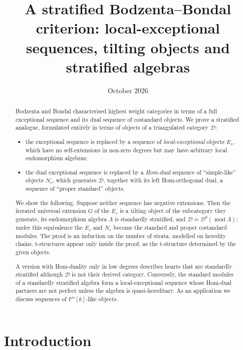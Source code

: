 \documentclass[11pt,reqno]{amsart}
\title[Local-exceptional sequences and stratified algebras]{A stratified Bodzenta--Bondal criterion: local-exceptional sequences, tilting objects and stratified algebras}
\date{October 2026}
\theoremstyle{plain}
\theoremstyle{definition}
\theoremstyle{remark}
\newcommand{\modd}{\operatorname{mod}}
\newcommand{\Db}{\mathcal{D}^b}
\newcommand{\Pn}[2]{\mathbb{P}^{#1}[#2]}
\newcommand{\cD}{\mathcal{D}}
\begin{document}
\begin{abstract}
Bodzenta and Bondal characterised highest weight categories in terms of a full exceptional sequence and its dual sequence of costandard objects. We prove a stratified analogue, formulated entirely in terms of objects of a triangulated category $\cD$:
\begin{itemize}
\item the exceptional sequence is replaced by a sequence of \emph{local-exceptional} objects $E_s$, which have no self-extensions in non-zero degrees but may have arbitrary local endomorphism algebras;
\item the dual exceptional sequence is replaced by a \emph{Hom-dual} sequence of ``simple-like'' objects $N_s$, which generates $\cD$, together with its left Hom-orthogonal dual, a sequence of ``proper standard'' objects.
\end{itemize}
We show the following. Suppose neither sequence has negative extensions. Then the iterated universal extension $G$ of the $E_s$ is a tilting object of the subcategory they generate, its endomorphism algebra $\Lambda$ is standardly stratified, and $\cD\simeq\Db(\modd\Lambda)$; under this equivalence the $E_s$ and $N_s$ become the standard and proper costandard modules. The proof is an induction on the number of strata, modelled on heredity chains. t-structures appear only inside the proof, as the t-structure determined by the given objects.

A version with Hom-duality only in low degrees describes hearts that are standardly stratified although $\cD$ is not their derived category. Conversely, the standard modules of a standardly stratified algebra form a local-exceptional sequence whose Hom-dual partners are not perfect unless the algebra is quasi-hereditary. As an application we discuss sequences of $\Pn nk$-like objects.
\end{abstract}

\maketitle

\setcounter{tocdepth}{1}
\tableofcontents

\section{Introduction}
\end{document}
